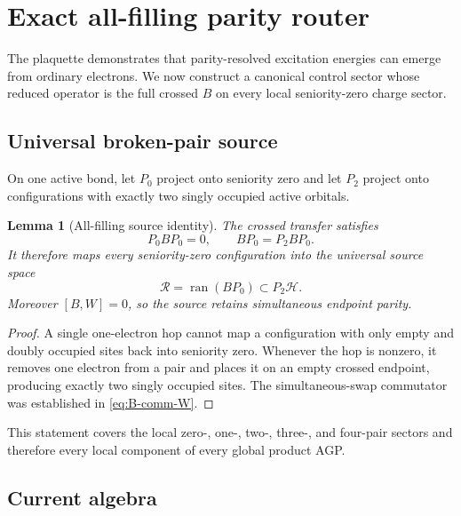 \documentclass[11pt]{article}
\newtheorem{lemma}[theorem]{Lemma}
\theoremstyle{definition}
\theoremstyle{remark}
\newcommand{\cH}{\mathcal H}
\newcommand{\cR}{\mathcal R}
\begin{document}
\section{Exact all-filling parity router}
\label{sec:all-filling}

The plaquette demonstrates that parity-resolved excitation energies can emerge from ordinary electrons.  We now construct a canonical control sector whose reduced operator is the full crossed $B$ on every local seniority-zero charge sector.

\subsection{Universal broken-pair source}

On one active bond, let $P_0$ project onto seniority zero and let $P_2$ project onto configurations with exactly two singly occupied active orbitals.

\begin{lemma}[All-filling source identity]
\label{lem:source}
The crossed transfer satisfies
\begin{equation}
 \boxed{P_0BP_0=0,\qquad BP_0=P_2BP_0.}
 \label{eq:source-identity}
\end{equation}
It therefore maps every seniority-zero configuration into the universal source space
\begin{equation}
 \cR=\operatorname{ran}(BP_0)\subset P_2\cH.
\end{equation}
Moreover $[B,W]=0$, so the source retains simultaneous endpoint parity.
\end{lemma}

\begin{proof}
A single one-electron hop cannot map a configuration with only empty and doubly occupied sites back into seniority zero.  Whenever the hop is nonzero, it removes one electron from a pair and places it on an empty crossed endpoint, producing exactly two singly occupied sites.  The simultaneous-swap commutator was established in \eqref{eq:B-comm-W}.
\end{proof}

This statement covers the local zero-, one-, two-, three-, and four-pair sectors and therefore every local component of every global product AGP.

\subsection{Current algebra}
\end{document}

